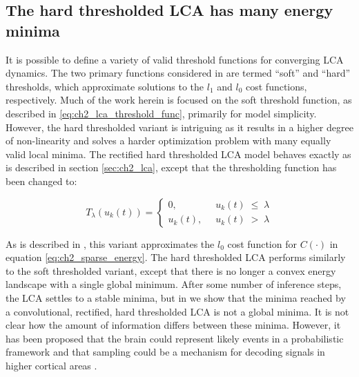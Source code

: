 \subsection{The hard thresholded LCA has many energy minima}\label{sec:ch2_hard_lca}
It is possible to define a variety of valid threshold functions for converging LCA dynamics. The two primary functions considered in \parencite{rozell2008sparse} are termed ``soft'' and ``hard'' thresholds, which approximate solutions to the $l_{1}$ and $l_{0}$ cost functions, respectively. Much of the work herein is focused on the soft threshold function, as described in \eqref{eq:ch2_lca_threshold_func}, primarily for model simplicity. However, the hard thresholded variant is intriguing as it results in a higher degree of non-linearity and solves a harder optimization problem with many equally valid local minima. The rectified hard thresholded LCA model behaves exactly as is described in section \ref{sec:ch2_lca}, except that the thresholding function has been changed to:

\begin{equation}\label{eq:ch2_lca_hard_threshold_func}
    T_{\lambda}(u_{k}(t)) = \left\{
    \begin{aligned}
        0,\;\; &u_{k}(t)\; \leq\; \lambda \\
        u_{k}(t),\;\; &u_{k}(t)\; >\; \lambda
    \end{aligned}
    \right.
\end{equation}

As is described in \parencite{rozell2008sparse}, this variant approximates the $l_0$ cost function for $C(\cdot)$ in equation \eqref{eq:ch2_sparse_energy}. The hard thresholded LCA performs similarly to the soft thresholded variant, except that there is no longer a convex energy landscape with a single global minimum. After some number of inference steps, the LCA settles to a stable minima, but in \parencite{shainin2016sampling} we show that the minima reached by a convolutional, rectified, hard thresholded LCA is not a global minima. It is not clear how the amount of information differs between these minima. However, it has been proposed that the brain could represent likely events in a probabilistic framework \parencite{lee2003hierarchical} and that sampling could be a mechanism for decoding signals in higher cortical areas \parencite{hoyer2003interpreting}.

